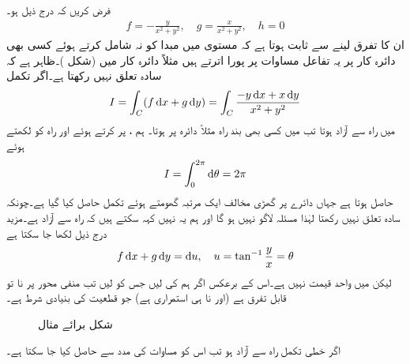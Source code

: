 فرض کریں کہ درج ذیل ہو۔
\begin{align*}
f=-\frac{y}{x^2+y^2},\quad g=\frac{x}{x^2+y^2},\quad h=0
\end{align*}
ان کا تفرق لینے سے ثابت ہوتا ہے کہ  مستوی میں مبدا کو نہ شامل کرتے ہوئے کسی بھی دائرہ کار پر  یہ تفاعل مساوات  پر پورا اترتے ہیں مثلاً دائرہ کار  میں (شکل )۔ظاہر ہے کہ  سادہ تعلق نہیں رکھتا ہے۔اگر تکمل
\begin{align*}
I=\int_C (f\dif x+g\dif y)=\int_C \frac{-y\dif x+x\dif y}{x^2+y^2}
\end{align*}
 میں راہ سے آزاد ہوتا تب  میں کسی بھی بند راہ مثلاً دائرہ  پر  ہوتا۔ ہم ،  پر کرتے ہوئے  اور راہ کو  لکھتے ہوئے 
\begin{align*}
I=\int_0^{2\pi}\dif \theta=2\pi
\end{align*}
حاصل ہوتا ہے جہاں دائرے پر گھڑی مخالف ایک مرتبہ گھومتے ہوئے تکمل حاصل کیا گیا ہے۔چونکہ  سادہ تعلق نہیں رکھتا لہٰذا  مسئلہ  لاگو نہیں ہو گا اور ہم یہ نہیں کہہ سکتے ہیں کہ  راہ سے آزاد ہے۔مزید درج ذیل لکھا جا سکتا ہے
\begin{align*}
f\dif x+g\dif y=\dif u,\quad u=\tan^{-1} \frac{y}{x}=\theta
\end{align*} 
لیکن  میں  واحد قیمت نہیں ہے۔اس کے برعکس اگر ہم  کی  لیں جس کو  لیں تب منفی محور  پر   نا تو قابل تفرق ہے (اور نا ہی استمراری ہے) جو قطعیت کی بنیادی شرط ہے۔
\begin{figure}
\centering
{}
\caption{شکل برائے مثال }
\label{شکل_مثال_خطی_تکمل_راہ_سے_آزاد_نہیں}
\end{figure}

اگر خطی تکمل راہ سے آزاد ہو تب اس کو مساوات  کی مدد سے حاصل کیا جا سکتا ہے۔

